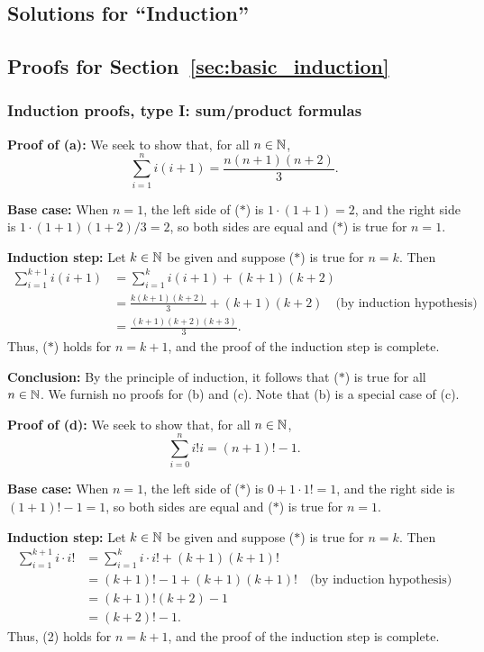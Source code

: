 \subsection{Solutions for ``Induction''}
\subsection{Proofs for Section~\ref{sec:basic_induction}}
\subsubsection{Induction proofs, type I: sum/product formulas}


\textbf{Proof of (a):}
We seek to show that, for all $n\in\mathbb{N}$,  
\[
\sum_{i=1}^n i(i+1)=\frac{n(n+1)(n+2)}{3}. 
\tag{$*$}
\]

\textbf{Base case:} When $n=1$, the left side of ($*$) is $1\cdot(1+1) =2$,
and the
right side is $1\cdot(1+1)(1+2)/3=2$, so both sides are equal and ($*$) is
true for $n=1$.

\textbf{Induction step:} Let $k\in\mathbb{N}$ be given and suppose 
($*$) is true for $n=k$. Then
\begin{align*}
\sum_{i=1}^{k+1}i(i+1)
&=
\sum_{i=1}^{k}i(i+1)
+(k+1)(k+2)
\\
&=\frac{k(k+1)(k+2)}{3} 
+(k+1)(k+2)
\quad \text{(by induction hypothesis)}
\\
&=\frac{(k+1)(k+2)(k+3)}{3}.
\end{align*}
Thus, ($*$) holds for $n=k+1$, and the proof of the induction step is complete. 

\textbf{Conclusion:} By the principle of induction,  it follows that
($*$) is true for all $n\in\mathbb{N}$.  
\medskip
We furnish no proofs for (b) and (c).  Note that (b) is a special case of (c).

\medskip


\textbf{Proof of (d):}
We seek to show that, for all $n\in\mathbb{N}$,
\[
\sum_{i=0}^n i! i
= (n+1)!-1. 
\tag{$*$}
\]

\textbf{Base case:} When $n=1$, the left side of ($*$) is $0+1 \cdot 1! =1$,
and the
right side is $(1+1)!-1=1$, so both sides are equal and ($*$) is
true for $n=1$.

\textbf{Induction step:} Let $k\in\mathbb{N}$ be given and suppose 
($*$) is true for $n=k$. Then
\begin{align*}
\sum_{i=1}^{k+1}i\cdot i!
&=
\sum_{i=1}^{k}i\cdot i! + (k+1)(k+1)!
\\
&= (k+1)!-1 + (k+1)(k+1)!
\quad \text{(by induction hypothesis)}
\\
&=(k+1)!(k+2)-1
\\
&=(k+2)!-1.
\end{align*}
Thus, (2) holds for $n=k+1$, and the proof of the induction step is complete. 

